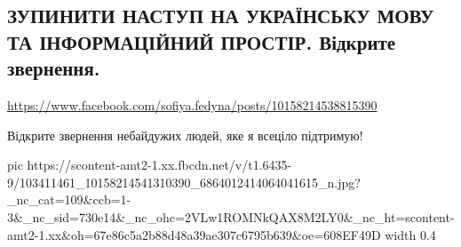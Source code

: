 
 
 
 
 

\subsection{ЗУПИНИТИ НАСТУП НА УКРАЇНСЬКУ МОВУ ТА ІНФОРМАЦІЙНИЙ ПРОСТІР. Відкрите звернення.}
\url{https://www.facebook.com/sofiya.fedyna/posts/10158214538815390}

Відкрите звернення небайдужих людей, яке я всеціло підтримую!


\ifcmt
  pic https://scontent-amt2-1.xx.fbcdn.net/v/t1.6435-9/103411461_10158214541310390_6864012414064041615_n.jpg?_nc_cat=109&ccb=1-3&_nc_sid=730e14&_nc_ohc=2VLw1ROMNkQAX8M2LY0&_nc_ht=scontent-amt2-1.xx&oh=67e86c5a2b88d48a39ae307c6795b639&oe=608EF49D
  width 0.4
\fi

